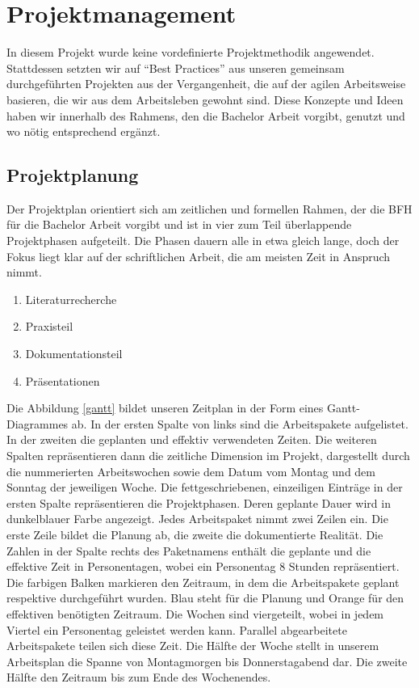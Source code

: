 \section{Projektmanagement}

In diesem Projekt wurde keine vordefinierte Projektmethodik angewendet. Stattdessen setzten wir auf
\enquote{Best Practices} aus unseren gemeinsam durchgeführten Projekten aus der Vergangenheit, die
auf der agilen Arbeitsweise basieren, die wir aus dem Arbeitsleben gewohnt sind. Diese Konzepte und
Ideen haben wir innerhalb des Rahmens, den die Bachelor Arbeit vorgibt, genutzt und wo nötig entsprechend
ergänzt.

\subsection{Projektplanung}

Der Projektplan orientiert sich am zeitlichen und formellen Rahmen, der die BFH für die Bachelor Arbeit vorgibt und ist in vier
zum Teil überlappende Projektphasen aufgeteilt.
Die Phasen dauern alle in etwa gleich lange, doch der Fokus liegt klar auf der schriftlichen Arbeit, die am meisten
Zeit in Anspruch nimmt.
\begin{enumerate}
    \item Literaturrecherche
    \item Praxisteil
    \item Dokumentationsteil
    \item Präsentationen
\end{enumerate}

Die Abbildung \ref{gantt} bildet unseren Zeitplan in der Form eines Gantt-Diagrammes ab. In der ersten Spalte von links sind die Arbeitspakete
aufgelistet. In der zweiten die geplanten und effektiv verwendeten Zeiten. Die weiteren Spalten repräsentieren dann die zeitliche
Dimension im Projekt, dargestellt durch die nummerierten Arbeitswochen sowie dem Datum vom Montag und dem Sonntag der jeweiligen Woche.
Die fettgeschriebenen, einzeiligen Einträge in der ersten Spalte repräsentieren die Projektphasen. Deren geplante Dauer wird in dunkelblauer Farbe
angezeigt.
Jedes Arbeitspaket nimmt zwei Zeilen ein. Die erste Zeile bildet die Planung ab, die zweite die dokumentierte Realität. Die Zahlen in
der Spalte rechts des Paketnamens enthält die geplante und die effektive Zeit in Personentagen, wobei ein Personentag 8 Stunden repräsentiert.
Die farbigen Balken markieren den Zeitraum, in dem die Arbeitspakete geplant respektive durchgeführt wurden. Blau steht für die Planung und
Orange für den effektiven benötigten Zeitraum.
Die Wochen sind viergeteilt, wobei in jedem Viertel ein Personentag geleistet werden kann. Parallel abgearbeitete Arbeitspakete teilen sich diese
Zeit. Die Hälfte der Woche stellt in unserem Arbeitsplan die Spanne von Montagmorgen bis Donnerstagabend dar. Die zweite Hälfte den Zeitraum bis
zum Ende des Wochenendes.


